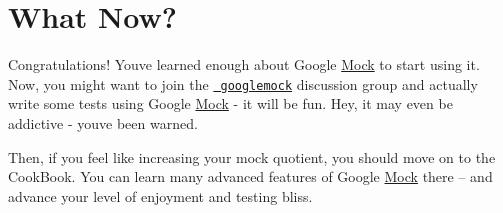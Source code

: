 \section*{What Now?}

Congratulations! You\textquotesingle{}ve learned enough about Google \mbox{\hyperlink{class_mock}{Mock}} to start using it. Now, you might want to join the \href{http://groups.google.com/group/googlemock}\texttt{ googlemock} discussion group and actually write some tests using Google \mbox{\hyperlink{class_mock}{Mock}} -\/ it will be fun. Hey, it may even be addictive -\/ you\textquotesingle{}ve been warned.

Then, if you feel like increasing your mock quotient, you should move on to the Cook\+Book. You can learn many advanced features of Google \mbox{\hyperlink{class_mock}{Mock}} there -- and advance your level of enjoyment and testing bliss. 